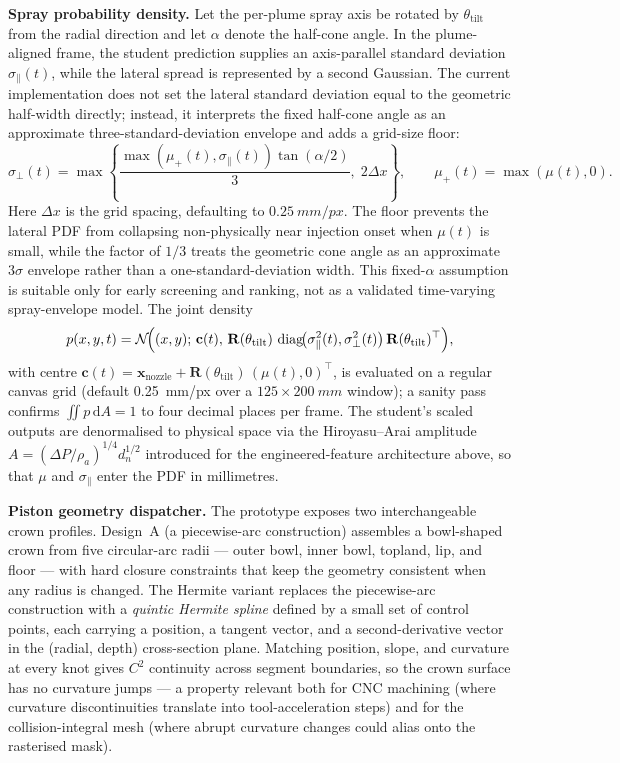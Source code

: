 \documentclass[english, 12pt, a4paper, elec, utf8, a-2b, online]{aaltothesis}
\begin{document}
\textbf{Spray probability density.}  Let the per-plume spray axis be rotated by $\theta_{\mathrm{tilt}}$ from the radial direction and let $\alpha$ denote the half-cone angle. In the plume-aligned frame, the student prediction supplies an axis-parallel standard deviation $\sigma_{\parallel}(t)$, while the lateral spread is represented by a second Gaussian. The current implementation does not set the lateral standard deviation equal to the geometric half-width directly; instead, it interprets the fixed half-cone angle as an approximate three-standard-deviation envelope and adds a grid-size floor:
\[
\sigma_{\perp}(t)
=\max\!\left\{
\frac{\max\!\left(\mu_{+}(t),\sigma_{\parallel}(t)\right)\tan(\alpha/2)}{3},
\;2\Delta x
\right\},\qquad
\mu_{+}(t)=\max(\mu(t),0).
\]
Here \(\Delta x\) is the grid spacing, defaulting to \(\SI{0.25}{mm/px}\). The floor prevents the lateral PDF from collapsing non-physically near injection onset when \(\mu(t)\) is small, while the factor of \(1/3\) treats the geometric cone angle as an approximate \(3\sigma\) envelope rather than a one-standard-deviation width. This fixed-\(\alpha\) assumption is suitable only for early screening and ranking, not as a validated time-varying spray-envelope model. The joint density
\[
p(x,y,t)=\mathcal{N}\!\Bigl((x,y);\,\mathbf{c}(t),\,\mathbf{R}(\theta_{\mathrm{tilt}})\,\operatorname{diag}\!\bigl(\sigma_{\parallel}^{2}(t),\sigma_{\perp}^{2}(t)\bigr)\,\mathbf{R}(\theta_{\mathrm{tilt}})^{\top}\Bigr),
\]
with centre $\mathbf{c}(t)=\mathbf{x}_{\mathrm{nozzle}}+\mathbf{R}(\theta_{\mathrm{tilt}})\,(\mu(t),0)^{\top}$, is evaluated on a regular canvas grid (default \SI{0.25}{mm/px} over a $125\times\SI{200}{mm}$ window); a sanity pass confirms $\iint p\,\mathrm{d}A=1$ to four decimal places per frame. The student's scaled outputs are denormalised to physical space via the Hiroyasu--Arai amplitude $A=(\Delta P/\rho_a)^{1/4}d_n^{1/2}$ introduced for the engineered-feature architecture above, so that $\mu$ and $\sigma_{\parallel}$ enter the PDF in millimetres.

\textbf{Piston geometry dispatcher.}  The prototype exposes two interchangeable crown profiles. Design~A (a piecewise-arc construction) assembles a bowl-shaped crown from five circular-arc radii --- outer bowl, inner bowl, topland, lip, and floor --- with hard closure constraints that keep the geometry consistent when any radius is changed. The Hermite variant replaces the piecewise-arc construction with a \emph{quintic Hermite spline} defined by a small set of control points, each carrying a position, a tangent vector, and a second-derivative vector in the (radial, depth) cross-section plane. Matching position, slope, and curvature at every knot gives $C^{2}$ continuity across segment boundaries, so the crown surface has no curvature jumps --- a property relevant both for CNC machining (where curvature discontinuities translate into tool-acceleration steps) and for the collision-integral mesh (where abrupt curvature changes could alias onto the rasterised mask).
\end{document}
